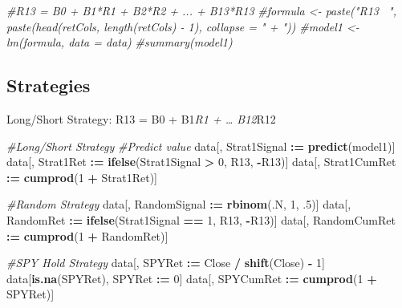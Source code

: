 \documentclass[]{article}
\newenvironment{Shaded}{\begin{snugshade}}{\end{snugshade}}
\newcommand{\CommentTok}[1]{\textcolor[rgb]{0.56,0.35,0.01}{\textit{#1}}}
\newcommand{\DecValTok}[1]{\textcolor[rgb]{0.00,0.00,0.81}{#1}}
\newcommand{\ErrorTok}[1]{\textcolor[rgb]{0.64,0.00,0.00}{\textbf{#1}}}
\newcommand{\FloatTok}[1]{\textcolor[rgb]{0.00,0.00,0.81}{#1}}
\newcommand{\KeywordTok}[1]{\textcolor[rgb]{0.13,0.29,0.53}{\textbf{#1}}}
\newcommand{\NormalTok}[1]{#1}
\newcommand{\OperatorTok}[1]{\textcolor[rgb]{0.81,0.36,0.00}{\textbf{#1}}}
\newcommand{\StringTok}[1]{\textcolor[rgb]{0.31,0.60,0.02}{#1}}
\begin{document}
\begin{Shaded}
\begin{Highlighting}[]
\CommentTok{#R13 = B0 + B1*R1 + B2*R2 + ... + B13*R13}
\CommentTok{#formula <- paste("R13 ~", paste(head(retCols, length(retCols) - 1), collapse = " + "))}
\CommentTok{#model1 <- lm(formula, data = data)}
\CommentTok{#summary(model1)}
\end{Highlighting}
\end{Shaded}

\hypertarget{strategies}{%
\subsection{Strategies}\label{strategies}}

Long/Short Strategy: R13 = B0 + B1\emph{R1 + \ldots{} B12}R12

\begin{Shaded}
\begin{Highlighting}[]
\CommentTok{#Long/Short Strategy}
\CommentTok{#Predict value}
\NormalTok{data[, Strat1Signal }\OperatorTok{:}\ErrorTok{=}\StringTok{ }\KeywordTok{predict}\NormalTok{(model1)]}
\NormalTok{data[, Strat1Ret }\OperatorTok{:}\ErrorTok{=}\StringTok{ }\KeywordTok{ifelse}\NormalTok{(Strat1Signal }\OperatorTok{>}\StringTok{ }\DecValTok{0}\NormalTok{, R13, }\OperatorTok{-}\NormalTok{R13)]}
\NormalTok{data[, Strat1CumRet }\OperatorTok{:}\ErrorTok{=}\StringTok{ }\KeywordTok{cumprod}\NormalTok{(}\DecValTok{1} \OperatorTok{+}\StringTok{ }\NormalTok{Strat1Ret)]}

\CommentTok{#Random Strategy}
\NormalTok{data[, RandomSignal }\OperatorTok{:}\ErrorTok{=}\StringTok{ }\KeywordTok{rbinom}\NormalTok{(.N, }\DecValTok{1}\NormalTok{, }\FloatTok{.5}\NormalTok{)]}
\NormalTok{data[, RandomRet }\OperatorTok{:}\ErrorTok{=}\StringTok{ }\KeywordTok{ifelse}\NormalTok{(Strat1Signal }\OperatorTok{==}\StringTok{ }\DecValTok{1}\NormalTok{, R13, }\OperatorTok{-}\NormalTok{R13)]}
\NormalTok{data[, RandomCumRet }\OperatorTok{:}\ErrorTok{=}\StringTok{ }\KeywordTok{cumprod}\NormalTok{(}\DecValTok{1} \OperatorTok{+}\StringTok{ }\NormalTok{RandomRet)]}

\CommentTok{#SPY Hold Strategy}
\NormalTok{data[, SPYRet }\OperatorTok{:}\ErrorTok{=}\StringTok{ }\NormalTok{Close }\OperatorTok{/}\StringTok{ }\KeywordTok{shift}\NormalTok{(Close) }\OperatorTok{-}\StringTok{ }\DecValTok{1}\NormalTok{]}
\NormalTok{data[}\KeywordTok{is.na}\NormalTok{(SPYRet), SPYRet }\OperatorTok{:}\ErrorTok{=}\StringTok{ }\DecValTok{0}\NormalTok{]}
\NormalTok{data[, SPYCumRet }\OperatorTok{:}\ErrorTok{=}\StringTok{ }\KeywordTok{cumprod}\NormalTok{(}\DecValTok{1} \OperatorTok{+}\StringTok{ }\NormalTok{SPYRet)]}
\end{Highlighting}
\end{Shaded}
\end{document}
